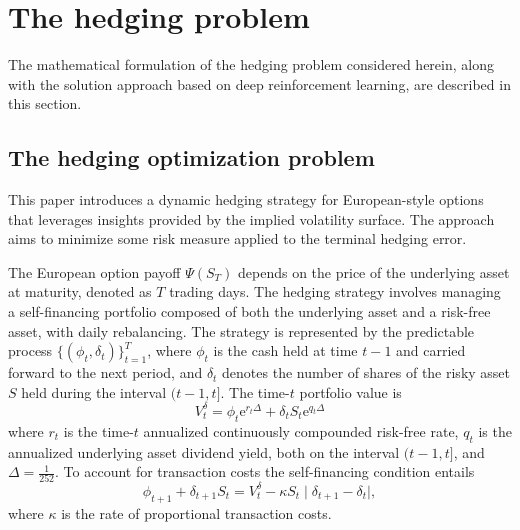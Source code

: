 \documentclass[12pt]{article}
\begin{document}
\section{The hedging problem}\label{se:hedgepro}

The mathematical formulation of the hedging problem considered herein, along with the solution approach based on deep reinforcement learning, are described in this section. 

\subsection{The hedging optimization problem}\label{subse:hedgepro_formulation}

This paper introduces a dynamic hedging strategy for European-style options that leverages insights provided by the implied volatility surface. The approach aims to minimize some risk measure applied to the terminal hedging error.

The European option payoff $\Psi(S_{T})$ depends on the price of the underlying asset at maturity, denoted as $T$ trading days. The hedging strategy involves managing a self-financing portfolio composed of both the underlying asset and a risk-free asset, with daily rebalancing.  The strategy is represented by the predictable process 
$\{ (\phi_{t}, \delta_{t}) \}_{t=1}^{T}$, where $\phi_{t}$ is the cash held at time $t-1$ and carried forward to the next period, and $\delta_{t}$ denotes the number of shares of the risky asset $S$ held during the interval $(t-1, t]$.
The time-$t$ portfolio value is
\begin{equation*} 
    V_{t}^{\delta}=\phi_{t}\mbox{e}^{r_{t}\Delta}+\delta_{t} S_{t}\mbox{e}^{q_{t}\Delta} 
\end{equation*}
where $r_{t}$ is the time-$t$ annualized continuously compounded risk-free rate, $q_{t}$ is the annualized underlying asset dividend yield, both on the interval $(t-1,t]$, and $\Delta=\frac{1}{252}$.
To account for transaction costs the self-financing condition entails 
\begin{equation}
\label{self-financing}
    \phi_{t+1} +\delta_{t+1}S_{t}= V_{t}^{\delta}-\kappa S_{t}\mid \delta_{t+1} - \delta_{t}\mid ,
\end{equation}
where $\kappa$ is the rate of proportional transaction costs.
\end{document}
